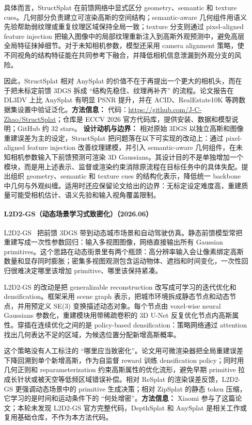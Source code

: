 具体而言，StructSplat 在前馈网络中显式区分 geometry、semantic 和 texture cues。几何部分负责建立可渲染高斯的空间结构；semantic-aware 几何组件用语义先验帮助弱纹理或重复纹理区域保持全局一致；texture 分支则通过 pixel-aligned feature injection 把输入图像中的局部纹理重新注入到高斯外观预测中，避免高层全局特征抹掉细节。对于未知相机参数，模型还采用 camera alignment 策略，使不同视角的结构特征能在共同参考下融合，并降低相机信息泄漏到外观分支的风险。

因此，StructSplat 相对 AnySplat 的价值不在于再提出一个更大的相机头，而在于把未标定前馈 3DGS 拆成 ``结构先稳住、纹理再补齐'' 的流程。论文报告在 DL3DV 上比 AnySplat 有明显 PSNR 提升，并在 ACID、RealEstate10K 等跨数据集设置中验证泛化。\textbf{方法信息：} 代码：\url{https://github.com/J-C-Zhao/StructSplat}；仓库是 ECCV 2026 官方代码库，提供安装、数据和模型说明；GitHub 约 32 stars。
\textbf{设计动机与边界：} 相对原始 3DGS 以独立高斯和图像重建误差为主的设定，StructSplat 把问题落在以下可实现的改动上：通过 pixel-aligned feature injection 改善纹理建模，并引入 semantic-aware 几何组件，在未知相机参数输入下前馈预测可渲染 3D Gaussians。其设计目的不是单独增加一个模块，而是用上述表示、监督或渲染约束消除原流程在目标任务中的具体失配。提出组织 geometry、semantic 和 texture cues 的结构化表示，降低统一 backbone 中几何与外观纠缠。适用时还应保留论文给出的边界：无标定设定难度高，重建质量可能受相机估计、语义先验和输入视角覆盖限制。
\paragraph{L2D2-GS（动态场景学习式致密化）（2026.06）}
L2D2-GS~\cite{2606_29374} 把前馈 3DGS 带到动态城市场景和自动驾驶仿真。静态前馈模型常把重建写成一次性参数回归：输入多视图图像，网络直接输出所有 Gaussian primitives。这个思路在动态街景里有两个瓶颈：高分辨率输入会让像素绑定高斯数量和显存同时膨胀；密集多视图观测包含运动物体、遮挡和时间变化，一次性回归很难决定哪里该增加 primitive、哪里该保持紧凑。

L2D2-GS 的改动是把 generalizable reconstruction 改写成可学习的迭代优化和 densification。框架采用 scene graph 表示，把城市环境拆成静态节点和动态节点，并用预定义 SE(3) 变换描述动态对象。每个节点由 voxel-wise neural Gaussians 参数化，重建模块用带稀疏卷积的 3D U-Net 反复优化节点内高斯属性。穿插在连续优化之间的是 policy-based densification：策略网络通过 attention 找出几何表达不足的区域，为候选位置分配新增高斯概率。

这个策略没有人工标注的 ``哪里应当致密化''。论文用可微渲染器把全局重建误差下降回溯到单个新增高斯，作为自监督 reward 训练 densification policy；同时用几何正则和 reparameterization 约束高斯属性的优化流形，避免早期 primitive 拉成长针状或被天空等低频区域错误补偿。相对 ReSplat 的渲染误差反馈，L2D2-GS 更强调动态场景中的 primitive 生成决策；相对 ZipSplat 的静态 token 压缩，它学习的是时间和运动条件下的 ``何处增密''。\textbf{方法信息：} Xiaomi 参与了这篇论文；本轮未发现 L2D2-GS 官方完整代码，DepthSplat 和 AnySplat 是相关工作或复用基础仓库，不作为本方法代码。


